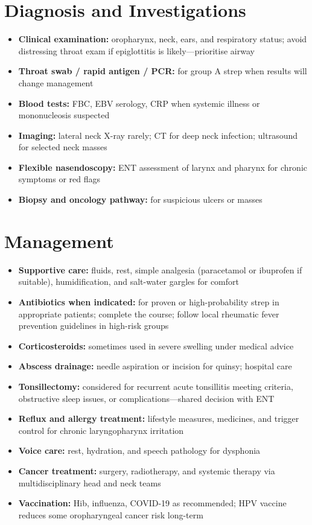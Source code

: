 \section*{Diagnosis and Investigations}
\begin{itemize}
    \item \textbf{Clinical examination:} oropharynx, neck, ears, and respiratory status; avoid distressing throat exam if epiglottitis is likely---prioritise airway
    \item \textbf{Throat swab / rapid antigen / PCR:} for group A strep when results will change management
    \item \textbf{Blood tests:} FBC, EBV serology, CRP when systemic illness or mononucleosis suspected
    \item \textbf{Imaging:} lateral neck X-ray rarely; CT for deep neck infection; ultrasound for selected neck masses
    \item \textbf{Flexible nasendoscopy:} ENT assessment of larynx and pharynx for chronic symptoms or red flags
    \item \textbf{Biopsy and oncology pathway:} for suspicious ulcers or masses
\end{itemize}

\section*{Management}
\begin{itemize}
    \item \textbf{Supportive care:} fluids, rest, simple analgesia (paracetamol or ibuprofen if suitable), humidification, and salt-water gargles for comfort
    \item \textbf{Antibiotics when indicated:} for proven or high-probability strep in appropriate patients; complete the course; follow local rheumatic fever prevention guidelines in high-risk groups
    \item \textbf{Corticosteroids:} sometimes used in severe swelling under medical advice
    \item \textbf{Abscess drainage:} needle aspiration or incision for quinsy; hospital care
    \item \textbf{Tonsillectomy:} considered for recurrent acute tonsillitis meeting criteria, obstructive sleep issues, or complications---shared decision with ENT
    \item \textbf{Reflux and allergy treatment:} lifestyle measures, medicines, and trigger control for chronic laryngopharynx irritation
    \item \textbf{Voice care:} rest, hydration, and speech pathology for dysphonia
    \item \textbf{Cancer treatment:} surgery, radiotherapy, and systemic therapy via multidisciplinary head and neck teams
    \item \textbf{Vaccination:} Hib, influenza, COVID-19 as recommended; HPV vaccine reduces some oropharyngeal cancer risk long-term
\end{itemize}

